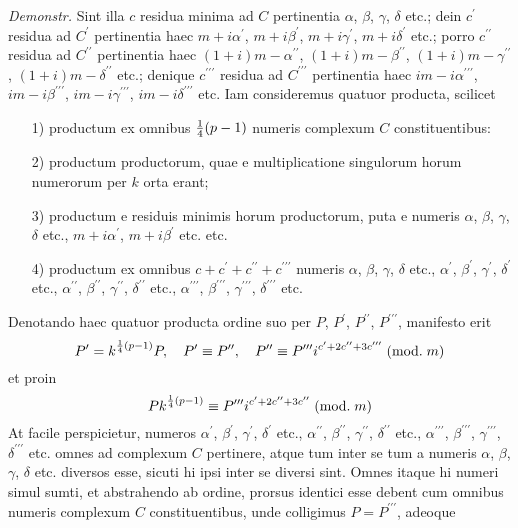 \documentclass[twoside,12pt, showframe]{memoir}
\renewcommand{\pmod}[1]{\;(\textrm{mod.}\;#1)}
\let\oldfrac\frac
\def\frac#1#2{\mathchoice{\tfrac{#1}{#2}}{\oldfrac{#1}{#2}}{\genfrac{}{}{}{2}{#1}{#2\mathstrut}}{\genfrac{}{}{}{3}{#1}{#2\mathstrut}}}
\begin{document}
\textit{Demonstr.} Sint illa \(c\) residua minima ad \(C\) pertinentia \(\alpha\), \( \beta\), \( \gamma\), \( \delta\) etc.; dein \(c^{\prime}\) residua ad \(C^{\prime}\) pertinentia haec \(m+i \alpha^{\prime}\), \( m+i \beta^{\prime}\), \( m+i \gamma^{\prime}\), \( m+i \delta^{\prime}\) etc.; porro \(c^{\prime \prime}\) residua ad \(C^{\prime \prime}\) pertinentia haec \((1+i) m-\alpha^{\prime \prime}\), \((1+i) m-\beta^{\prime \prime}\), \((1+i) m-\gamma^{\prime \prime}\), \((1+i) m-\delta^{\prime \prime}\) etc.; denique \(c^{\prime \prime \prime}\) residua ad \(C^{\prime \prime \prime}\) pertinentia haec \(i m-i \alpha^{\prime \prime \prime}\), \( i m-i \beta^{\prime \prime \prime}\), \(i m-i \gamma^{\prime \prime \prime}\), \( i m-i \delta^{\prime \prime \prime}\) etc. Iam consideremus quatuor producta, scilicet
 \begin{enumerate}
\item[1)] productum ex omnibus \(\frac{1}{4}(p-1)\) numeris complexum \(C\) constituentibus:
\item[2)] productum productorum, quae e multiplicatione singulorum horum numerorum per \(k\) orta erant;
\item[3)] productum e residuis minimis horum productorum, puta e numeris \(\alpha\), \( \beta\), \(\gamma\), \( \delta\) etc., \(m+i \alpha^{\prime}\), \( m+i \beta^{\prime}\) etc. etc.
\item[4)] productum ex omnibus \(c+c^{\prime}+c^{\prime \prime}+c^{\prime \prime \prime}\) numeris \(\alpha\), \( \beta\), \( \gamma\), \( \delta\) etc., \(\alpha^{\prime}\), \( \beta^{\prime}\), \( \gamma^{\prime}\), \(\delta^{\prime}\) etc., \(\alpha^{\prime \prime}\), \( \beta^{\prime \prime}\), \( \gamma^{\prime \prime}\), \( \delta^{\prime \prime}\) etc., \(\alpha^{\prime \prime \prime}\), \( \beta^{\prime \prime \prime}\), \( \gamma^{\prime \prime \prime}\), \( \delta^{\prime \prime \prime}\) etc.
\end{enumerate}
Denotando haec quatuor producta ordine suo per \(P\), \( P^{\prime} \), \( P^{\prime \prime}\), \( P^{\prime \prime \prime}\), manifesto erit
\[P^{\prime}=k^{\frac{1}{4}(p-1)} P, \quad P^{\prime} \equiv P^{\prime \prime}, \quad P^{\prime \prime} \equiv P^{\prime \prime \prime} i^{c^{\prime}+2 c^{\prime \prime}+3 c^{\prime \prime \prime}}\pmod{m}\]
et proin
\[P k^{\frac{1}{4}(p-1)} \equiv P^{\prime \prime \prime} i^{c^{\prime}+2 c^{\prime \prime}+3 c^{\prime \prime}}\pmod{m}\]
At facile perspicietur, numeros \(\alpha^{\prime}\), \( \beta^{\prime}\), \( \gamma^{\prime}\), \( \delta^{\prime}\) etc., \(\alpha^{\prime \prime}\), \( \beta^{\prime \prime}\), \( \gamma^{\prime \prime}\), \( \delta^{\prime \prime}\) etc., \(\alpha^{\prime \prime \prime}\), \( \beta^{\prime \prime \prime}\), \( \gamma^{\prime \prime \prime}\), \( \delta^{\prime \prime \prime}\) etc. omnes ad complexum \(C\) pertinere, atque tum inter se tum a numeris \(\alpha\), \( \beta\), \( \gamma\), \( \delta\) etc. diversos esse, sicuti hi ipsi inter se diversi sint. Omnes itaque hi numeri simul sumti, et abstrahendo ab ordine, prorsus identici esse debent cum omnibus numeris complexum \(C\) constituentibus, unde colligimus \(P=P^{\prime \prime \prime}\), adeoque
\end{document}
